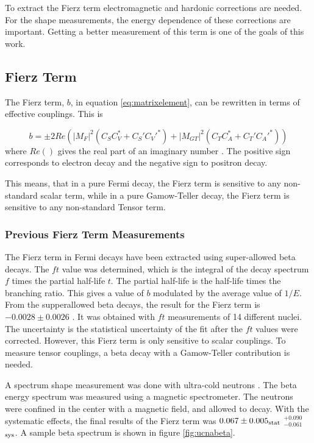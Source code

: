 \documentclass[../MaxHughesThesis.tex]{subfiles}
\begin{document}
To extract the Fierz term electromagnetic and hardonic corrections are needed.
For the shape measurements, the energy dependence of these corrections are important.
Getting a better measurement of this term is one of the goals of this work.

\subsection{Fierz Term}
The Fierz term, $b$, in equation \ref{eq:matrixelement}, can be rewritten in terms of effective couplings.
This is %

\begin{equation}
	b =  \pm 2 Re(|M_{F}|^{2}(C_{S}C_{V}^{*} + C_{S}'C_{V}'^{*}) + |M_{GT}|^{2}(C_{T}C_{A}^{*} + C_{T}'C_{A}'^{*}))
	\label{eq:bwrittenout}
\end{equation}
where $Re()$ gives the real part of an imaginary number \cite{Jack57}.
The positive sign corresponds to electron decay and the negative sign to positron decay.  

This means, that in a pure Fermi decay, the Fierz term is sensitive to any non-standard scalar term, while in a pure Gamow-Teller decay, the Fierz term is sensitive to any non-standard Tensor term. 

\subsubsection{Previous Fierz Term Measurements}
The Fierz term in Fermi decays have been extracted using super-allowed beta decays.
The $ft$ value was determined, which is the integral of the decay spectrum $f$ times the partial half-life $t$.
The partial half-life is the half-life times the branching ratio.
This gives a value of $b$ modulated by the average value of $1/E$.
From the supperallowed beta decays, the result for the Fierz term is $-0.0028 \pm 0.0026$ \cite{Har17}.
It was obtained with $ft$ measurements of 14 different nuclei.
The uncertainty is the statistical uncertainty of the fit after the $ft$ values were corrected.
However, this Fierz term is only sensitive to scalar couplings.
To measure tensor couplings, a beta decay with a Gamow-Teller contribution is needed. 

A spectrum shape measurement was done with ultra-cold neutrons \cite{Hic17}.
The beta energy spectrum was measured using a magnetic spectrometer.
The neutrons were confined in the center with a magnetic field, and allowed to decay.
With the systematic effects, the final results of the Fierz term was $0.067 \pm 0.005_{\rm{stat}}$ $^{+0.090}_{-0.061}$ $_{\rm{sys}}$.
A sample beta spectrum is shown in figure \ref{fig:ucnabeta}.
\end{document}
